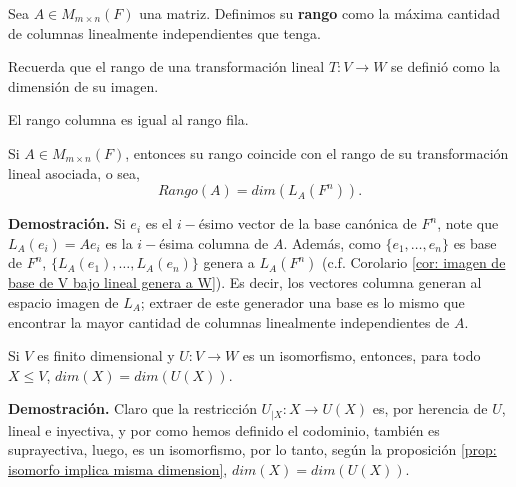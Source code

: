 \begin{defi}
Sea $A \in M_{m \times n}(F)$ una matriz. Definimos su \textbf{rango}
como la máxima cantidad de columnas linealmente independientes que tenga.
\end{defi}

Recuerda que el rango de una transformación
lineal $T: V \longrightarrow W$ se definió como la dimensión de
su imagen.

\begin{prop}
El rango columna es igual al rango fila. 
\end{prop}

\begin{prop}
	\label{prop: rango de matriz A coincide con rango de transf LA}
Si $A \in M_{m \times n}(F)$, entonces su rango coincide con el rango
de su transformación lineal asociada, o sea, 
\begin{equation}
	\label{eq: rango de matriz usando su transformacion lineal}
	Rango(A) = dim(L_{A}(F^{n})).
\end{equation}
\end{prop}
\noindent
\textbf{Demostración.}
Si $e_{i}$ es el $i-$ésimo vector de la base canónica de $F^{n}$, 
note que $L_{A}(e_{i}) = Ae_{i}$ es la $i-$ésima columna de $A$.
Además, como $\{ e_{1}, \ldots, e_{n} \}$ es base de
$F^{n}$, $\{ L_{A}(e_{1}), \ldots, L_{A}(e_{n}) \}$
genera a $L_{A}(F^{n})$ (c.f. Corolario
\ref{cor: imagen de base de V bajo lineal genera a W}). Es decir,
los vectores columna generan al espacio imagen de $L_{A}$; extraer
de este generador una base es lo mismo que encontrar la mayor
cantidad de columnas linealmente independientes de $A$.

\QEDB
\vspace{0.2cm}

\begin{prop}
	\label{prop: isomorfismos respetan dimension de subespacios}
Si $V$ es finito dimensional y $U: V \longrightarrow W$ es un isomorfismo,
entonces, para todo $X \leq V$, $dim(X) = dim(U(X))$.
\end{prop}
\noindent
\textbf{Demostración.}
Claro que la restricción
$U_{|X}: X \longrightarrow U(X)$ es, por herencia de $U$,
lineal e inyectiva, y por como hemos definido el codominio, también
es suprayectiva, luego, es un isomorfismo, por lo tanto, 
según la proposición 
\ref{prop: isomorfo implica misma dimension}, 
$dim(X) = dim(U(X))$.
\QEDB
\vspace{0.2cm}


